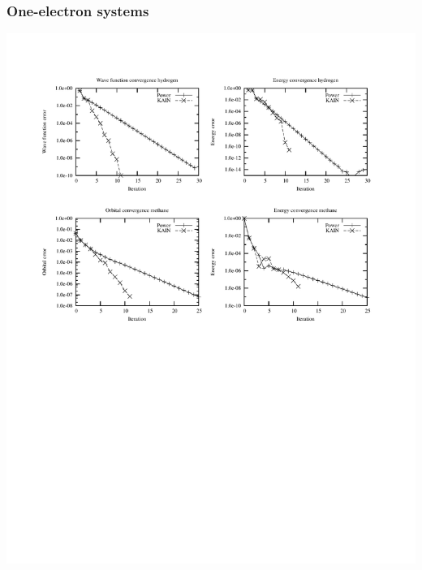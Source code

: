 \documentclass[mathserif]{beamer}
\begin{document}
\begin{frame}
    \frametitle{One-electron systems}
    \begin{center}
	\includegraphics[scale=0.6, clip, viewport = 50 550 540 730]{figures/convergence.pdf}
    \end{center}
\end{frame}
\end{document}
